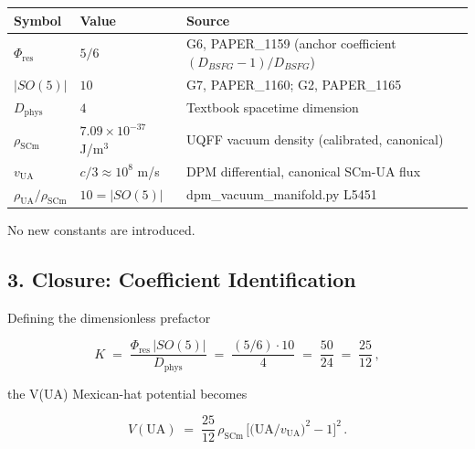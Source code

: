 \documentclass[
]{article}
\newcounter{none} %
\begin{document}
{\def\LTcaptype{none} %
\begin{longtable}[]{@{}
  >{\raggedright\arraybackslash}p{}
  >{\raggedright\arraybackslash}p{}
  >{\raggedright\arraybackslash}p{}@{}}
\toprule\noalign{}
\begin{minipage}[b]{\linewidth}\raggedright
Symbol
\end{minipage} & \begin{minipage}[b]{\linewidth}\raggedright
Value
\end{minipage} & \begin{minipage}[b]{\linewidth}\raggedright
Source
\end{minipage} \\
\midrule\noalign{}
\endhead
\bottomrule\noalign{}
\endlastfoot
\(\Phi_{\mathrm{res}}\) & \(5/6\) & G6, PAPER\_1159 (anchor coefficient
\((D_{BSFG}-1)/D_{BSFG}\)) \\
\(|SO(5)|\) & \(10\) & G7, PAPER\_1160; G2, PAPER\_1165 \\
\(D_{\mathrm{phys}}\) & \(4\) & Textbook spacetime dimension \\
\(\rho_{\mathrm{SCm}}\) & \(7.09 \times 10^{-37}\) J/m\(^3\) & UQFF
vacuum density (calibrated, canonical) \\
\(v_{\mathrm{UA}}\) & \(c/3 \approx 10^{8}\) m/s & DPM differential,
canonical SCm-UA flux \\
\(\rho_{\mathrm{UA}}/\rho_{\mathrm{SCm}}\) & \(10 = |SO(5)|\) &
dpm\_vacuum\_manifold.py L5451 \\
\end{longtable}
}

No new constants are introduced.

\subsection{3. Closure: Coefficient
Identification}\label{closure-coefficient-identification}

Defining the dimensionless prefactor

\[ K \;=\; \frac{\Phi_{\mathrm{res}}\,|SO(5)|}{D_{\mathrm{phys}}}
   \;=\; \frac{(5/6)\cdot 10}{4}
   \;=\; \frac{50}{24} \;=\; \frac{25}{12}\,, \]

the V(UA) Mexican-hat potential becomes

\[ V(\mathrm{UA}) \;=\; \frac{25}{12}\,\rho_{\mathrm{SCm}}\,
   \Big[\big(\mathrm{UA}/v_{\mathrm{UA}}\big)^{2} - 1\Big]^{2}\,. \]
\end{document}
